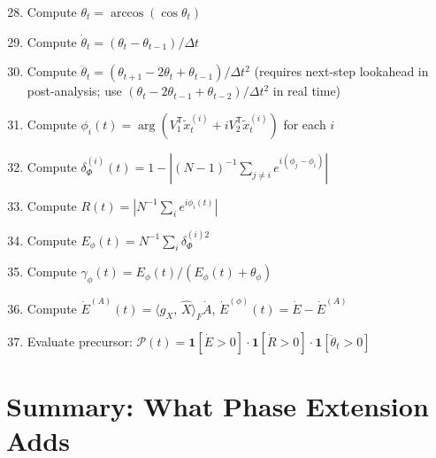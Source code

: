 \documentclass[11pt,a4paper]{article}
\theoremstyle{definition}
\newcommand{\T}{^{\mathsf{T}}}
\newcommand{\inner}[2]{\langle #1,\,#2\rangle}
\newcommand{\gX}{g_X}
\begin{document}
\begin{enumerate}
\setcounter{enumi}{27}
\item Compute $\theta_t = \arccos(\cos\theta_t)$
\item Compute $\dot\theta_t = (\theta_t - \theta_{t-1})/\Delta t$
\item Compute $\ddot\theta_t = (\theta_{t+1} - 2\theta_t + \theta_{t-1})/\Delta t^2$ \hfill (requires next-step lookahead in post-analysis; use $(\theta_t - 2\theta_{t-1}+\theta_{t-2})/\Delta t^2$ in real time)
\item Compute $\phi_i(t) = \arg(V_1\T\tilde x_t^{(i)} + iV_2\T\tilde x_t^{(i)})$ for each $i$
\item Compute $\delta_\Phi^{(i)}(t) = 1 - |(N-1)^{-1}\sum_{j\neq i}e^{i(\phi_j-\phi_i)}|$
\item Compute $R(t) = |N^{-1}\sum_i e^{i\phi_i(t)}|$
\item Compute $E_\phi(t) = N^{-1}\sum_i\delta_\Phi^{(i)2}$
\item Compute $\gamma_\phi(t) = E_\phi(t)/(E_\phi(t)+\theta_\phi)$
\item Compute $\dot E^{(A)}(t) = \inner{\gX}{\hat X}_F\dot A$, $\dot E^{(\phi)}(t) = \dot E - \dot E^{(A)}$
\item Evaluate precursor: $\mathcal{P}(t) = \mathbf{1}[\dot E > 0]\cdot\mathbf{1}[\dot R > 0]\cdot\mathbf{1}[\ddot\theta_t > 0]$
\end{enumerate}

\section{Summary: What Phase Extension Adds}
\end{document}
